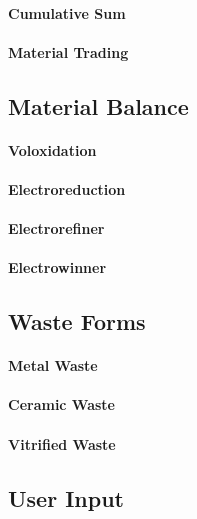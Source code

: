 \paragraph{Cumulative Sum}

\paragraph{Material Trading}

\subsection{Material Balance}
\paragraph{Voloxidation}

\paragraph{Electroreduction}

\paragraph{Electrorefiner}

\paragraph{Electrowinner}

\subsection{Waste Forms}
\paragraph{Metal Waste}

\paragraph{Ceramic Waste}

\paragraph{Vitrified Waste}


\subsection{User Input}
